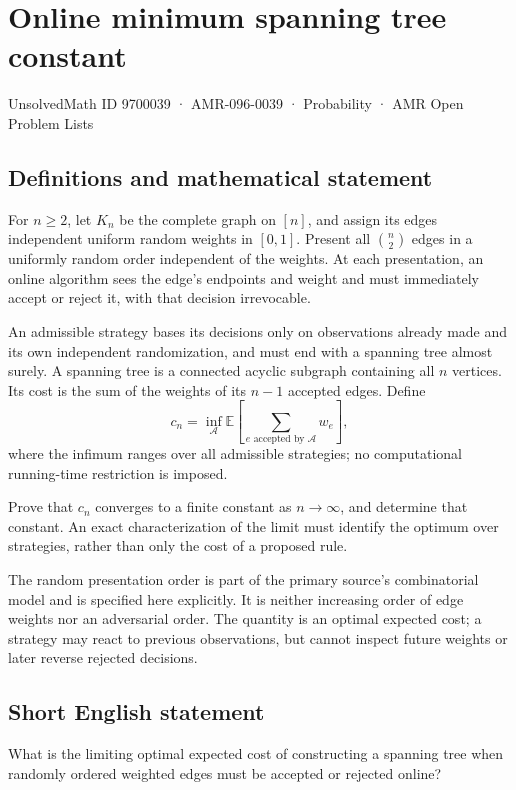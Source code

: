 \documentclass[11pt,a4paper]{article}
\begin{document}
\section*{Online minimum spanning tree constant}\label{9700039}
{\small UnsolvedMath ID 9700039 · AMR-096-0039 · Probability · AMR Open Problem Lists}
\subsection{Definitions and mathematical statement}
For $n\ge2$, let $K_n$ be the complete graph on $[n]$, and assign its edges independent uniform random weights in $[0,1]$. Present all $\binom n2$ edges in a uniformly random order independent of the weights. At each presentation, an online algorithm sees the edge's endpoints and weight and must immediately accept or reject it, with that decision irrevocable.

An admissible strategy bases its decisions only on observations already made and its own independent randomization, and must end with a spanning tree almost surely. A spanning tree is a connected acyclic subgraph containing all $n$ vertices. Its cost is the sum of the weights of its $n-1$ accepted edges. Define
\[
c_n=\inf_{\mathcal A}\mathbb E\left[
\sum_{e\text{ accepted by }\mathcal A}w_e\right],
\]
where the infimum ranges over all admissible strategies; no computational running-time restriction is imposed.

Prove that $c_n$ converges to a finite constant as $n\to\infty$, and determine that constant. An exact characterization of the limit must identify the optimum over strategies, rather than only the cost of a proposed rule.

The random presentation order is part of the primary source's combinatorial model and is specified here explicitly. It is neither increasing order of edge weights nor an adversarial order. The quantity is an optimal expected cost; a strategy may react to previous observations, but cannot inspect future weights or later reverse rejected decisions.
\subsection{Short English statement}
What is the limiting optimal expected cost of constructing a spanning tree when randomly ordered weighted edges must be accepted or rejected online?
\end{document}
